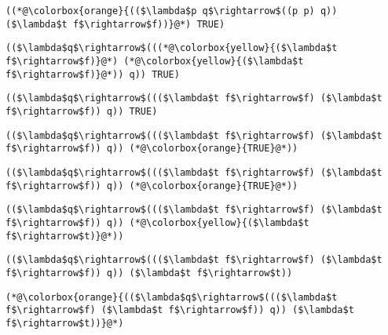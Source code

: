 \documentclass{beamer}
\begin{document}
\begin{frame}[fragile]{\CurrentSection}
\lstset{basicstyle=\ttfamily\small}\lstset{numbers=none}\lstset{language=ML}\begin{lstlisting}
((*@\colorbox{orange}{(($\lambda$p q$\rightarrow$((p p) q)) ($\lambda$t f$\rightarrow$f))}@*) TRUE)
\end{lstlisting}
\pause\lstset{language=ML}\begin{lstlisting}
(($\lambda$q$\rightarrow$(((*@\colorbox{yellow}{($\lambda$t f$\rightarrow$f)}@*) (*@\colorbox{yellow}{($\lambda$t f$\rightarrow$f)}@*)) q)) TRUE)
\end{lstlisting}

\end{frame}

\begin{frame}[fragile]{\CurrentSection}
\lstset{basicstyle=\ttfamily\small}\lstset{numbers=none}\lstset{language=ML}\begin{lstlisting}
(($\lambda$q$\rightarrow$((($\lambda$t f$\rightarrow$f) ($\lambda$t f$\rightarrow$f)) q)) TRUE)
\end{lstlisting}
\pause\lstset{language=ML}\begin{lstlisting}
(($\lambda$q$\rightarrow$((($\lambda$t f$\rightarrow$f) ($\lambda$t f$\rightarrow$f)) q)) (*@\colorbox{orange}{TRUE}@*))
\end{lstlisting}

\end{frame}

\begin{frame}[fragile]{\CurrentSection}
\lstset{basicstyle=\ttfamily\small}\lstset{numbers=none}\lstset{language=ML}\begin{lstlisting}
(($\lambda$q$\rightarrow$((($\lambda$t f$\rightarrow$f) ($\lambda$t f$\rightarrow$f)) q)) (*@\colorbox{orange}{TRUE}@*))
\end{lstlisting}
\pause\lstset{language=ML}\begin{lstlisting}
(($\lambda$q$\rightarrow$((($\lambda$t f$\rightarrow$f) ($\lambda$t f$\rightarrow$f)) q)) (*@\colorbox{yellow}{($\lambda$t f$\rightarrow$t)}@*))
\end{lstlisting}

\end{frame}

\begin{frame}[fragile]{\CurrentSection}
\lstset{basicstyle=\ttfamily\small}\lstset{numbers=none}\lstset{language=ML}\begin{lstlisting}
(($\lambda$q$\rightarrow$((($\lambda$t f$\rightarrow$f) ($\lambda$t f$\rightarrow$f)) q)) ($\lambda$t f$\rightarrow$t))
\end{lstlisting}
\pause\lstset{language=ML}\begin{lstlisting}
(*@\colorbox{orange}{(($\lambda$q$\rightarrow$((($\lambda$t f$\rightarrow$f) ($\lambda$t f$\rightarrow$f)) q)) ($\lambda$t f$\rightarrow$t))}@*)
\end{lstlisting}

\end{frame}
\end{document}
